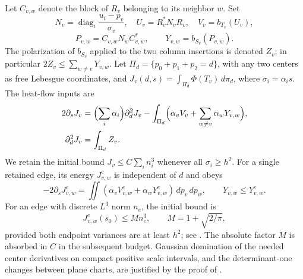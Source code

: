 \documentclass[11pt,a4paper]{article}
\theoremstyle{definition}
\newcommand{\1}{\mathbf1}
\begin{document}
Let $C_{v,w}$ denote the block of $R_v$ belonging to its neighbor $w$.
Set
\[
 N_v=\operatorname{diag}_i\frac{u_i-p_v}{\sigma_v},\quad
 U_v=R_v^*N_vR_v,\quad V_v=b_{T_v}(U_v),
\]
\[
 P_{v,w}=C_{v,w}N_wC_{v,w}^*,\qquad
 Y_{v,w}=b_{S_v}(P_{v,w}).
\]
The polarization of $b_{S_v}$ applied to the two column insertions is
 denoted $Z_v$; in particular $2Z_v\le\sum_{w\ne v}Y_{v,w}$.
Let $\Pi_d=\{p_0+p_1+p_2=d\}$, with any two centers as free Lebesgue
coordinates, and $J_v(d,s)=\int_{\Pi_d}\Phi(T_v)\,d\pi_d$, where
$\sigma_i=\alpha_i s$. The heat-flow inputs are
\begin{align}\label{eq:heat-input}
 2\partial_s J_v
 &=\Bigl(\sum_i\alpha_i\Bigr)\partial_d^2J_v
   -\int_{\Pi_d}\Bigl(\alpha_vV_v+\sum_{w\ne v}\alpha_wY_{v,w}\Bigr),\notag\\
 \partial_d^2J_v&=\int_{\Pi_d}Z_v.
\end{align}
We retain the initial bound $J_v\le C\sum_i n_i^3$ whenever all
$\sigma_i\ge h^2$. For a single retained edge, its energy $J^e_{v,w}$
is independent of $d$ and obeys
\[
 -2\partial_sJ^e_{v,w}
 =\iint(\alpha_vV^e_{v,w}+\alpha_wY^e_{v,w})\,dp_v\,dp_w,
 \qquad Y_{v,w}\le Y^e_{v,w}.
\]
For an edge with discrete $L^3$ norm $n_e$, the initial bound is
\[
 J^e_{v,w}(s_0)\le M n_e^3,\qquad M=1+\sqrt{2/\pi},
\]
provided both endpoint variances are at least $h^2$; see
\cite[Lemmas \texttt{lem:initial-energy} and
\texttt{lem:single-edge-energy}]{FrozenHeat}.
The absolute factor $M$ is absorbed in $C$ in the subsequent budget.
Gaussian domination of the needed center derivatives on compact positive
scale intervals, and the determinant-one changes between plane charts,
are justified by the proof of
\cite[Lemma \texttt{lem:heat-identities}]{FrozenHeat}.
\end{document}
